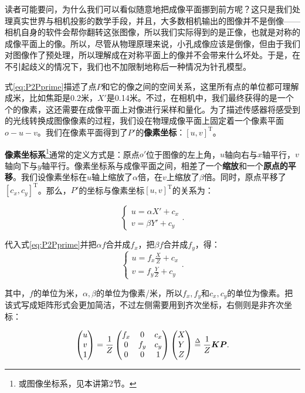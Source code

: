 读者可能要问，为什么我们可以看似随意地把成像平面挪到前方呢？这只是我们处理真实世界与相机投影的数学手段，并且，大多数相机输出的图像并不是倒像——相机自身的软件会帮你翻转这张图像，所以我们实际得到的是正像，也就是对称的成像平面上的像。所以，尽管从物理原理来说，小孔成像应该是倒像，但由于我们对图像作了预处理，所以理解成在对称平面上的像并不会带来什么坏处。于是，在不引起歧义的情况下，我们也不加限制地称后一种情况为针孔模型。

式\eqref{eq:P2Pprime}描述了点$P$和它的像之间的空间关系，这里所有点的单位都可理解成米，比如焦距是0.2米，$X'$是0.14米。不过，在相机中，我们最终获得的是一个个的像素，这还需要在成像平面上对像进行采样和量化。为了描述传感器将感受到的光线转换成图像像素的过程，我们设在物理成像平面上固定着一个像素平面$o-u-v$。我们在像素平面得到了$P'$的\textbf{像素坐标}：$[u,v]^\mathrm{T}$。

\textbf{像素坐标系}\footnote{或图像坐标系，见本讲第2节。}通常的定义方式是：原点$o'$位于图像的左上角，$u$轴向右与$x$轴平行，$v$轴向下与$y$轴平行。像素坐标系与成像平面之间，相差了一个\textbf{缩放}和一个\textbf{原点的平移}。我们设像素坐标在$u$轴上缩放了$\alpha$倍，在$v$上缩放了$\beta$倍。同时，原点平移了$[c_x, c_y]^\mathrm{T}$。那么，$P'$的坐标与像素坐标$[u,v]^\mathrm{T}$的关系为：

\begin{equation}
\label{eq:project2pixel1} 
\left\{
\begin{matrix} 
u=\alpha X' + c_x\\ 
v=\beta Y' + c_y
\end{matrix}
\right. .
\end{equation}

代入式\eqref{eq:P2Pprime}并把$\alpha f$合并成$f_x$，把$\beta f$合并成$f_y$，得：
\begin{equation}
\left\{
\begin{matrix} 
u=f_x\frac{X}{Z} + c_x\\ 
v=f_y\frac{Y}{Z} + c_y
\end{matrix}
\right. .
\end{equation}

其中，$f$的单位为米，$\alpha,\beta$的单位为像素/米，所以$f_x,f_y$和$c_x, c_y$的单位为像素。把该式写成矩阵形式会更加简洁，不过左侧需要用到齐次坐标，右侧则是非齐次坐标：

\begin{equation}
\label{eq:intrinmatrix} 
\begin{pmatrix} u\\ v\\ 1 \end{pmatrix}=\frac{1}{Z}\begin{pmatrix} f_x & 0&c_x \\ 0& f_y& c_y\\ 0&0 & 1 \end{pmatrix}\begin{pmatrix} X\\ Y\\ Z \end{pmatrix} 
\buildrel \Delta \over =\frac{1}{Z} \bm{K} \bm{P}.
\end{equation}

